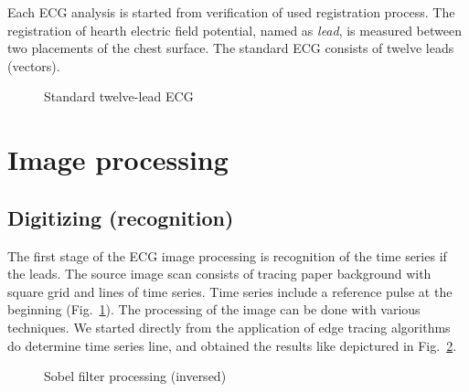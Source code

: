 \documentclass[runningheads]{AIIT}
\begin{document}
Each ECG analysis is started from verification of used registration process.  The registration of hearth electric field potential, named as \emph{lead}, is measured between two placements of the chest surface.  The standard ECG consists of twelve leads (vectors).

\begin{figure}[htb]
  \centering

  \caption{Standard twelve-lead ECG}
  \label{fig:leads-ex}
\end{figure}

\section{Image processing}
\label{sec:image-processing}

\subsection{Digitizing (recognition)}
\label{sec:digit-recogn}

The first stage of the ECG image processing is recognition of the time series if the leads.  The source image scan consists of tracing paper background with square grid and lines of time series.  Time series include a reference pulse at the beginning (Fig.~\ref{fig:leads-ex}).  The processing of the image can be done with various techniques.  We started directly from the application of edge tracing algorithms do determine time series line, and obtained the results like depictured in Fig.~\ref{fig:sobel-ex}.

\begin{figure}[htb]
  \centering

  \caption{Sobel filter processing (inversed)}
  \label{fig:sobel-ex}
\end{figure}
\end{document}
